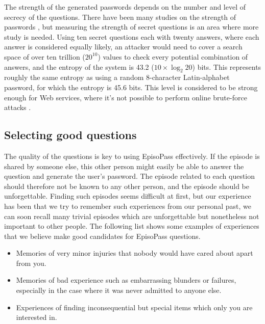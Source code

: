 \documentclass[runningheads,a4paper]{llncs}
\begin{document}
The strength of the generated passwords depends on the number and 
level of secrecy of the questions.
%
There have been many studies on the strength of passwords
\cite{Hayashi:2011:DSP:1978942.1979326,Komanduri:2011:PPM:1978942.1979321}, %
but measuring the strength of secret questions is an area where more study is needed.
Using ten secret questions each with twenty answers, where each answer is considered equally likely,
an attacker would need to cover a search space of over ten trillion ($20^{10}$) values to check
every potential combination of answers,
and the entropy of the system is 43.2 ($10 \times \log_2 20$) bits.  %
%
This represents roughly the same entropy as using a random 8-character Latin-alphabet
password, for which the entropy is 45.6 bits.
This level is considered to be strong enough for Web services,
where it's not possible to perform online brute-force attacks \cite{Florencio:2007:SWP:1361419.1361429}.

\subsection{Selecting good questions}

The quality of the questions is key to using EpisoPass effectively.
If the episode is shared by someone else,
this other person might easily be able to answer the question and generate the
user's password.
%
The episode related to each question should therefore not be known to any other person,
and the episode should be unforgettable.
%
Finding such episodes seems difficult at first, but our experience
has been that we try to remember such experiences from our personal past,
we can soon recall many trivial episodes which are unforgettable but
nonetheless not important to other people.
%
The following list shows some examples of experiences that we believe make good candidates for
EpisoPass questions.

\begin{itemize}
\item Memories of very minor injuries that nobody would have cared about apart from you.

\item Memories of bad experience such as embarrassing blunders or failures, especially in the case where
it was never admitted to anyone else.

\item Experiences of finding inconsequential but special items which only you are interested in.
\end{itemize}
\end{document}
